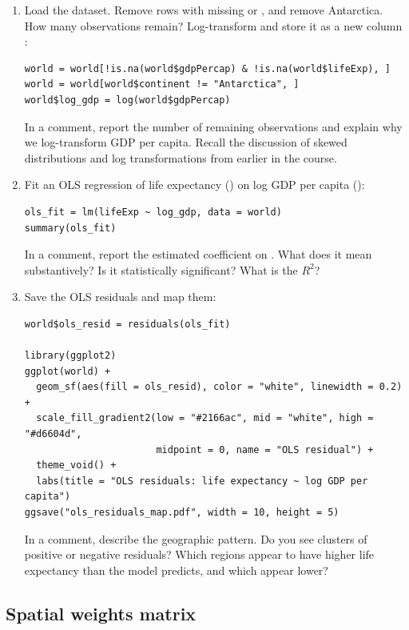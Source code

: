 \begin{enumerate}[label=\alph*)]

  \item Load the  dataset. Remove rows with missing  or , and remove Antarctica. How many observations remain? Log-transform  and store it as a new column :
  \begin{lstlisting}
world = world[!is.na(world$gdpPercap) & !is.na(world$lifeExp), ]
world = world[world$continent != "Antarctica", ]
world$log_gdp = log(world$gdpPercap)
  \end{lstlisting}
  In a comment, report the number of remaining observations and explain why we log-transform GDP per capita. Recall the discussion of skewed distributions and log transformations from earlier in the course.

  \item Fit an OLS regression of life expectancy () on log GDP per capita ():
  \begin{lstlisting}
ols_fit = lm(lifeExp ~ log_gdp, data = world)
summary(ols_fit)
  \end{lstlisting}
  In a comment, report the estimated coefficient on . What does it mean substantively? Is it statistically significant? What is the $R^2$?

  \item Save the OLS residuals and map them:
  \begin{lstlisting}
world$ols_resid = residuals(ols_fit)

library(ggplot2)
ggplot(world) +
  geom_sf(aes(fill = ols_resid), color = "white", linewidth = 0.2) +
  scale_fill_gradient2(low = "#2166ac", mid = "white", high = "#d6604d",
                       midpoint = 0, name = "OLS residual") +
  theme_void() +
  labs(title = "OLS residuals: life expectancy ~ log GDP per capita")
ggsave("ols_residuals_map.pdf", width = 10, height = 5)
  \end{lstlisting}
  In a comment, describe the geographic pattern. Do you see clusters of positive or negative residuals? Which regions appear to have higher life expectancy than the model predicts, and which appear lower?

\end{enumerate}

\subsection{Spatial weights matrix}

